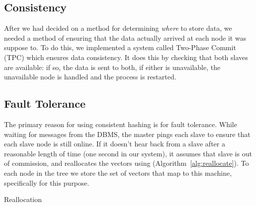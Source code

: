 \subsection{Consistency}
After we had decided on a method for determining \emph{where} to store data,
we needed a method of ensuring that the data actually arrived at each node it
was suppose to. To do this, we implemented a system called Two-Phase Commit
(TPC) which ensures data consistency. It does this by checking that both slaves
are available: if so, the data is sent to both, if either is unavailable, the
unavailable node is handled and the process is restarted.
%
\subsection{Fault Tolerance}
The primary reason for using consistent hashing is for fault tolerance. While
waiting for messages from the DBMS, the master pings each slave to ensure that
each slave node is still online. If it doesn't hear back from a slave after a
reasonable length of time (one second in our system), it assumes that slave is
out of commission, and reallocates the vectors using 
(Algorithm~\ref{alg:reallocate}). To each node in the tree we store the set of
vectors that map to this machine, specifically for this purpose.
%
\begin{algorithm}
    \begin{algorithmic}
            \EndFor
            \EndFor
        \EndProcedure
    \end{algorithmic}
    \caption{Reallocation}
    \label{alg:reallocate}
\end{algorithm}
%
